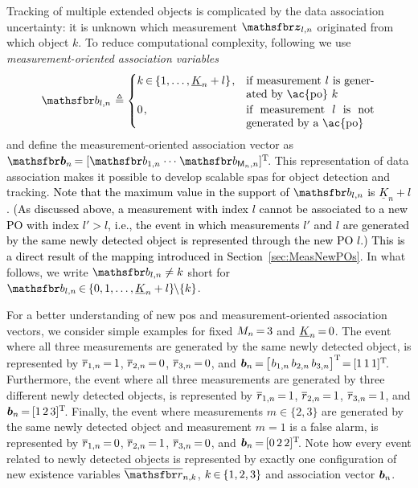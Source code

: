 \documentclass[10pt, twoside, romanappendices]{IEEEtran}
\providecommand{\rd}{\textcolor{black}}
\providecommand{\ist}{\hspace*{.3mm}}
\providecommand{\rmv}{\hspace*{-.3mm}}
\begin{document}
Tracking of multiple extended objects is complicated by the data association uncertainty: it is unknown which measurement $\RV{z}_{l,n}$ originated from which object $k$.  
To reduce computational complexity, following \cite{WilLau:J14,MeyBraWilHla:J17,MeyKroWilLauHlaBraWin:J18} we use \emph{measurement-oriented association variables}
\vspace{.5mm}
\[ 
\rv{b}_{l,n} \ist\triangleq \begin{cases} 
    k \rmv\in\rmv \{1,\dots,\underline{K}_n + l\} \ist , & \begin{minipage}[t]{40mm}if measurement $l$ is generated by \ac{po} $k$\end{minipage}\\[4mm]
   0 \ist, & \begin{minipage}[t]{40mm}if measurement $l$ is not generated by a \ac{po}\end{minipage}
  \end{cases}
\vspace{.5mm}
\]
and define the measurement-oriented association vector as $\RV{b}_n \rmv= [\rv{b}_{1,n} \ist \cdots \ist \rv{b}_{\mathsf{M}_n,n}]^{\mathrm{T}}\rmv\rmv$. This representation of data association makes it possible to develop scalable \acp{spa} for object detection and tracking. \rd{Note that the maximum value in the support of $\rv{b}_{l,n}$  is $\underline{K}_n + l$. (As discussed above, a measurement with index $l$ cannot be associated to a new PO with index $l' > l$, i.e., the event in which measurements $l'$ and $l$ are generated by the same newly detected object is represented through the new PO $l$.) This is a direct result of the mapping introduced in Section~\ref{sec:MeasNewPOs}.} In what follows, we write $\rv{b}_{l,n} \neq k$ short for $\rv{b}_{l,n} \rmv\in\rmv \{0,1,\dots,\underline{K}_n + l\} \rmv\backslash \{k\}$.

For a better understanding of new \acp{po} and measurement-oriented association vectors, we consider simple examples for fixed $M_n \rmv=\rmv 3$ and $\underline{K}_n \rmv=\rmv 0$. The event where all three measurements are generated by the same newly detected object, is represented by $\overline{r}_{1,n} \rmv=\rmv 1$, $\overline{r}_{2,n} \rmv=\rmv 0$, $\overline{r}_{3,n} \rmv=\rmv 0$, and $\V{b}_{n} \rmv=\rmv \big[\ist b_{1,n} \ist\ist b_{2,n}\ist\ist b_{3,n}\big]^{\mathrm{T}}  \rmv\rmv=\rmv [1\ist\ist1\ist\ist1]^{\mathrm{T}}\rmv\rmv$. Furthermore, the event where all three measurements are generated by three different newly detected objects, is represented by $\overline{r}_{1,n} \rmv=\rmv 1$,  $\overline{r}_{2,n} \rmv=\rmv 1$, $\overline{r}_{3,n} \rmv=\rmv 1$, and $\V{b}_{n} \rmv=\rmv [1\ist\ist2\ist\ist3]^{\mathrm{T}}\rmv\rmv$. Finally, the event where measurements $m \in \{2,3\}$ are generated by the same newly detected object and measurement $m = 1$ is a false alarm, is represented by $\overline{r}_{1,n} \rmv=\rmv 0$, $\overline{r}_{2,n} \rmv=\rmv 1$, $\overline{r}_{3,n} \rmv=\rmv 0$, and $\V{b}_{n} \rmv=\rmv [0\ist\ist2\ist\ist2]^{\mathrm{T}}\rmv\rmv$. Note how every event related to newly detected objects is represented by exactly one configuration of new existence variables $\overline{\rv{r}}_{n,k}$, $k \rmv\in\rmv \{1,2,3\}$ and association vector $\bm{b}_{n}$.
\end{document}
